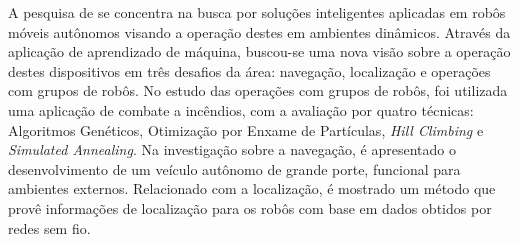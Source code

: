 A pesquisa de  se concentra na busca por soluções inteligentes aplicadas em robôs móveis autônomos visando a operação 
destes em ambientes dinâmicos. Através da aplicação de aprendizado de máquina, buscou-se uma nova visão sobre a operação destes 
dispositivos em três desafios da área: navegação, localização e operações com grupos de robôs. 
No estudo das operações com grupos de robôs, foi utilizada uma aplicação de combate a 
incêndios, com a avaliação por quatro técnicas: Algoritmos Genéticos, 
Otimização por Enxame de Partículas, \textit{Hill Climbing} e \textit{Simulated Annealing}. Na investigação sobre a navegação, é 
apresentado o desenvolvimento de um veículo autônomo de grande porte, funcional para ambientes externos. Relacionado com a localização, 
é mostrado um método que provê informações de localização para os robôs com base em dados obtidos por redes sem fio.



